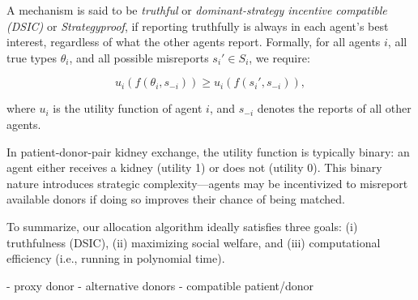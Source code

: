 A mechanism is said to be \textit{truthful}  or \textit{dominant-strategy incentive compatible (DSIC)} or \textit{Strategyproof}, if reporting truthfully is always in each agent's best interest, regardless of what the other agents report. Formally, for all agents $i$, all true types $\theta_i$, and all possible misreports $s_i' \in S_i$, we require:

\[
u_i(f(\theta_i, s_{-i})) \geq u_i(f(s_i', s_{-i})),
\]

where $u_i$ is the utility function of agent $i$, and $s_{-i}$ denotes the reports of all other agents.

In patient-donor-pair kidney exchange, the utility function is typically binary: an agent either receives a kidney (utility 1) or does not (utility 0). This binary nature introduces strategic complexity—agents may be incentivized to misreport available donors if doing so improves their chance of being matched.

To summarize, our allocation algorithm ideally satisfies three goals: (i) truthfulness (DSIC), (ii) maximizing social welfare, and (iii) computational efficiency (i.e., running in polynomial time).


- proxy donor
- alternative donors
- compatible patient/donor

